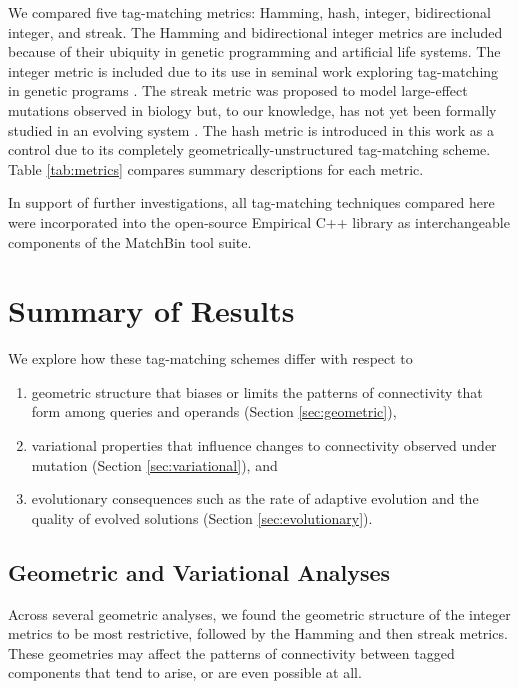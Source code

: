 

We compared five tag-matching metrics: Hamming, hash, integer, bidirectional integer, and streak.
The Hamming and bidirectional integer metrics are included because of their ubiquity in genetic programming and artificial life systems.
The integer metric is included due to its use in seminal work exploring tag-matching in genetic programs \citep{spector2011tag, spector2011s,spector2012tag}.
The streak metric was proposed to model large-effect mutations observed in biology but, to our knowledge, has not yet been formally studied in an evolving system \citep{downing2015intelligence}.
The hash metric is introduced in this work as a control due to its completely geometrically-unstructured tag-matching scheme.
Table \ref{tab:metrics} compares summary descriptions for each metric.

In support of further investigations, all tag-matching techniques compared here were incorporated into the open-source Empirical C++ library \citep{charles_ofria_2019_2575607} as interchangeable components of the MatchBin tool suite.

\section{Summary of Results}

We explore how these tag-matching schemes differ with respect to
\begin{enumerate}
  \item geometric structure that biases or limits the patterns of connectivity that form among queries and operands (Section \ref{sec:geometric}),
  \item variational properties that influence changes to connectivity observed under mutation (Section \ref{sec:variational}), and
  \item evolutionary consequences such as the rate of adaptive evolution and the quality of evolved solutions (Section \ref{sec:evolutionary}).
\end{enumerate}

\subsection{Geometric and Variational Analyses}

Across several geometric analyses, we found the geometric structure of the integer metrics to be most restrictive, followed by the Hamming and then streak metrics.
These geometries may affect the patterns of connectivity between tagged components that tend to arise, or are even possible at all.

